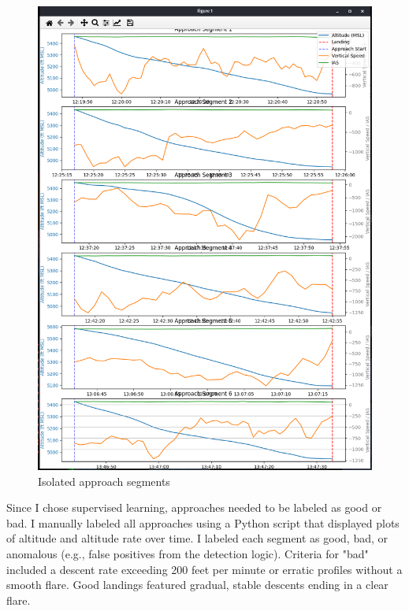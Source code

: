 \documentclass[conference]{IEEEtran}
\begin{document}
\begin{figure}[H]
    \centerline{\includegraphics[width=\linewidth]{approach_segments.png}}
    \caption{Isolated approach segments}
\end{figure}

Since I chose supervised learning, approaches needed to be labeled as good or bad. I manually labeled all approaches using a Python script that displayed plots of altitude and altitude rate over time. I labeled each segment as good, bad, or anomalous (e.g., false positives from the detection logic). Criteria for "bad" included a descent rate exceeding 200 feet per minute or erratic profiles without a smooth flare. Good landings featured gradual, stable descents ending in a clear flare.
\end{document}
